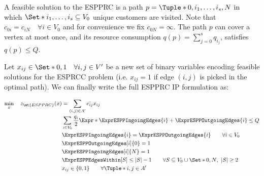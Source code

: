 A feasible solution to the ESPPRC is a path $p = \Tuple*{0, i_1, \dots, i_s, N}$
in which $\Set*{i_1, \dots, i_s} \subseteq V_0$ unique customers are visited.
Note that $c_{0i} = c_{iN} \quad \forall i \in V_0$ and for convenience we fix
$c_{0N} = \infty$.
The path $p$ can cover a vertex at most once, and its resource consumption
$q(p) = \sum_{j = 0}^{s} q_{i_j}$, satisfies $q(p) \le Q$.


\medskip

Let $x_{ij} \in \Set*{0, 1} \quad \forall i, j \in V^\prime$ be a new set of binary variables
encoding feasible solutions for the ESPRCC problem (i.e. $x_{ij} = 1$ if edge $(i, j)$ is picked in the optimal path).
We can finally write the full ESPPRC IP formulation as:

\begin{align}
	\min_{x} \quad z_\mt{ESPPRC}(x) & =  \sum_{(i, j) \in A^\prime} \bar{c_{ij}} x_{ij} \label{eq:espprc-obj-function}                                                                                                                   \\
	                                & \sum_{i \in V_0} \frac{q_i}{2} \Expr*{ \ExprESPPIngoingEdges{i} + \ExprESPPOutgoingEdges{i} }  \le Q                            \label{eq:espprc-resource-upper-bound-constraint}                  \\
	                                & \ExprESPPIngoingEdges{i} = \ExprESPPOutgoingEdges{i}                                                \qquad \forall i \in V_0          \label{eq:espprc-flow-conservation-constraint-customers}     \\
	                                & \ExprESPPOutgoingEdges[i]{0} = 1                                                                                                      \label{eq:espprc-source-emitting-flow}                       \\
	                                & \ExprESPPIngoingEdges[i]{N} = 1                                                                                                       \label{eq-espprc-sink-consuming-flow}                        \\
	                                & \ExprESPPEdgesWithin[S] \le |S| - 1                                                                  \qquad \forall S \subseteq V_0 \cup \Set*{0, N},\ |S| \ge 2 \label{eq:espprc-sec-constraints} \\
	                                & x_{ij}                   \in \lbrace 0, 1 \rbrace                                                    \qquad \forall \Tuple*{i, j} \in A^\prime    \label{eq:espprc-x-mip-var-bounds}               \\
\end{align}

